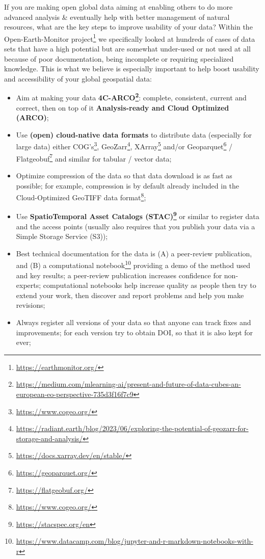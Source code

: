 \documentclass[
  graybox,natbib,nospthms]{svmono}
\providecommand{\tightlist}{%
  \setlength{\itemsep}{0pt}\setlength{\parskip}{0pt}}
\providecommand{\tightlist}{\setlength{\itemsep}{0pt}\setlength{\parskip}{0pt}}
\renewcommand{\href}[2]{#2 (\url{#1})}
\renewcommand{\href}[2]{#2\footnote{\url{#1}}}
\begin{document}
If you are making open global data aiming at enabling others
to do more advanced analysis \& eventually help with better management of
natural resources, what are the key steps to improve usability of
your data? Within the \href{https://earthmonitor.org/}{Open-Earth-Monitor project} we specifically
looked at hundreds of cases of data sets that have a high potential
but are somewhat under-used or not used at all because of poor documentation,
being incomplete or requiring specialized knowledge. This is what we believe is especially
important to help boost usability and accessibility of your global geospatial data:

\begin{itemize}
\tightlist
\item
  Aim at making your data \textbf{\href{https://medium.com/mlearning-ai/present-and-future-of-data-cubes-an-european-eo-perspective-735d3f16f7c9}{4C-ARCO}}: complete, consistent, current and correct, then on top of it \textbf{Analysis-ready and Cloud Optimized (ARCO)};
\item
  Use \textbf{(open) cloud-native data formats} to distribute data (especially for large data) either \href{https://www.cogeo.org/}{COG's}, \href{https://radiant.earth/blog/2023/06/exploring-the-potential-of-geozarr-for-storage-and-analysis/}{GeoZarr}, \href{https://docs.xarray.dev/en/stable/}{XArray} and/or \href{https://geoparquet.org/}{Geoparquet} / \href{https://flatgeobuf.org/}{Flatgeobuf} and similar for tabular / vector data;
\item
  Optimize compression of the data so that data download is as fast as possible; for example, compression is by default already included in the \href{https://www.cogeo.org/}{Cloud-Optimized GeoTIFF data format};
\item
  Use \textbf{\href{https://stacspec.org/en}{SpatioTemporal Asset Catalogs (STAC)}} or similar to register data and the access points (usually also requires that you publish your data via a Simple Storage Service (S3));
\item
  Best technical documentation for the data is (A) a peer-review publication, and (B) a \href{https://www.datacamp.com/blog/jupyter-and-r-markdown-notebooks-with-r}{computational notebook} providing a demo of the method used and key results; a peer-review publication increases confidence for non-experts; computational notebooks help increase quality as people then try to extend your work, then discover and report problems and help you make revisions;
\item
  Always register all versions of your data so that anyone can track fixes and improvements; for each version try to obtain DOI, so that it is also kept for ever;

\end{itemize}
\end{document}

